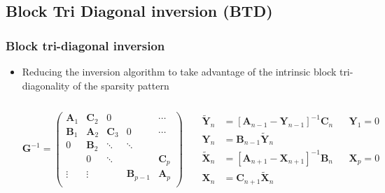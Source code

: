 \subsection{Block Tri Diagonal inversion (BTD)}

\begin{frame}
  \frametitle{Block tri-diagonal inversion}

  \begin{itemize}
    \item
    Reducing the inversion algorithm to take advantage of the intrinsic block tri-diagonality of
    the sparsity pattern

    \begin{columns}[c]
      
      
      \begin{equation*}
        \mathbf G^{-1}=
        \begin{pmatrix}
          \bm A_1 & \bm C_2 & 0 & &\cdots \\
          \bm B_1 & \bm A_2 & \bm C_3 & 0& \cdots \\
          0 & \bm B_2 &\ddots & \ddots \\
          & 0  & \ddots & & \bm C_p \\
          \vdots & \vdots  &   & \bm B_{p-1} & \bm A_p\\
        \end{pmatrix}
      \end{equation*}


      \begin{align*}
        \widetilde{\mathbf Y}_n&=\left[\mathbf A_{n-1}-\mathbf Y_{n-1}\right]^{-1}
        \mathbf C_n %
        & & \mathbf Y_1=0
        \\
        \mathbf Y_n&=\mathbf B_{n-1}\widetilde{\mathbf Y}_n
        \\
        \widetilde{\mathbf X}_n & =\left[\mathbf A_{n+1}-\mathbf X_{n+1}\right]^{-1}
        \mathbf B_n %
        & & \mathbf X_p=0
        \\
        \mathbf X_n & =\mathbf C_{n+1}\widetilde{\mathbf X}_n
      \end{align*}

    \end{columns}


\end{itemize}
\end{frame}
